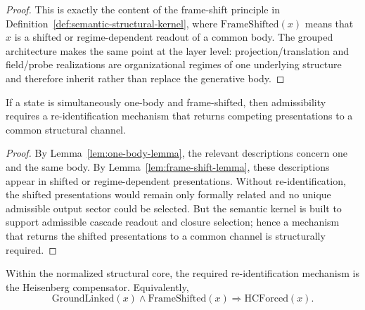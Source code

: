 \begin{proof}
This is exactly the content of the frame-shift principle in
Definition~\ref{def:semantic-structural-kernel}, where
$\mathrm{FrameShifted}(x)$ means that $x$ is a shifted or regime-dependent
readout of a common body. The grouped architecture makes the same point at the
layer level: projection/translation and field/probe realizations are
organizational regimes of one underlying structure and therefore inherit rather
than replace the generative body.
\end{proof}

\begin{lemma}
\label{lem:re-identification-lemma}
If a state is simultaneously one-body and frame-shifted, then admissibility
requires a re-identification mechanism that returns competing presentations to a
common structural channel.
\end{lemma}

\begin{proof}
By Lemma~\ref{lem:one-body-lemma}, the relevant descriptions concern one and the
same body. By Lemma~\ref{lem:frame-shift-lemma}, these descriptions appear in
shifted or regime-dependent presentations. Without re-identification, the
shifted presentations would remain only formally related and no unique
admissible output sector could be selected. But the semantic kernel is built to
support admissible cascade readout and closure selection; hence a mechanism that
returns the shifted presentations to a common channel is structurally required.
\end{proof}

\begin{theorem}
\label{thm:hc-forcing-theorem}
Within the normalized structural core, the required re-identification mechanism
is the Heisenberg compensator. Equivalently,
\[
\mathrm{GroundLinked}(x)\wedge \mathrm{FrameShifted}(x)
\Longrightarrow \mathrm{HCForced}(x).
\]
\end{theorem}

